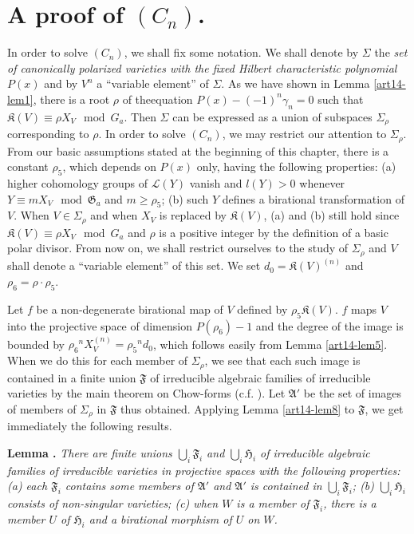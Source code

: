 \section{A proof of \texorpdfstring{$(C_{n})$}{Cn}.}\label{art14-sec9}

In order to solve $(C_{n})$, we shall fix some notation. We shall denote by $\Sigma$ the {\em set of canonically polarized varieties with the fixed Hilbert characteristic polynomial} $P(x)$ and by $V^{n}$ a ``variable element'' of $\Sigma$. As we have shown in Lemma \ref{art14-lem1}, there is a root $\rho$ of the\pageoriginale equation $P(x)-(-1)^{n}\gamma_{n}=0$ such that $\mathfrak{K}(V)\equiv \rho X_{V}\mod G_{a}$. Then $\Sigma$ can be expressed as a union of subspaces $\Sigma_{\rho}$ corresponding to $\rho$. In order to solve $(C_{n})$, we may restrict our attention to $\Sigma_{\rho}$. From our basic assumptions stated at the beginning of this chapter, there is a constant $\rho_{5}$, which depends on $P(x)$ only, having the following properties: (a) higher cohomology groups of $\mathscr{L}(Y)$ vanish and $l(Y)>0$ whenever $Y\equiv mX_{V}\mod \mathfrak{G}_{a}$ and $m\geq \rho_{5}$; (b) such $Y$ defines a birational transformation of $V$. When $V\in \Sigma_{\rho}$ and when $X_{V}$ is replaced by $\mathfrak{K}(V)$, (a) and (b) still hold since $\mathfrak{K}(V)\equiv\rho X_{V}\mod G_{a}$ and $\rho$ is a positive integer by the definition of a basic polar divisor. From now on, we shall restrict ourselves to the study of $\Sigma_{\rho}$ and $V$ shall denote a ``variable element'' of this set. We set $d_{0}=\mathfrak{K}(V)^{(n)}$ and $\rho_{6}=\rho\cdot \rho_{5}$.

Let $f$ be a non-degenerate birational map of $V$ defined by $\rho_{5}\mathfrak{K}(V)$. $f$ maps $V$ into the projective space of dimension $P(\rho_{6})-1$ and the degree of the image is bounded by $\rho_{6}{}^{n}X_{V}^{(n)}=\rho_{5}{}^{n}d_{0}$, which follows easily from Lemma \ref{art14-lem5}. When we do this for each member of $\Sigma_{\rho}$, we see that each such image is contained in a finite union $\mathfrak{F}$ of irreducible algebraic families of irreducible varieties by the main theorem on Chow-forms (c.f. \cite{art14-key3}). Let $\mathfrak{A}'$ be the set of images of members of $\Sigma_{\rho}$ in $\mathfrak{F}$ thus obtained. Applying Lemma \ref{art14-lem8} to $\mathfrak{F}$, we get immediately the following results.

\medskip
\noindent
{\bf Lemma .\label{art14-lem14}}
{\em There are finite unions $\bigcup_{i}\mathfrak{F}_{i}$ and $\bigcup_{i}\mathfrak{H}_{i}$ of irreducible algebraic families of irreducible varieties in projective spaces with the following properties: {\rm(a)} each $\mathfrak{F}_{i}$ contains some members of $\mathfrak{A}'$ and $\mathfrak{A}'$ is contained in $\bigcup_{i}\mathfrak{F}_{i}$; {\rm(b)} $\bigcup_{i}\mathfrak{H}_{i}$ consists of non-singular varieties; {\rm(c)} when $W$ is a member of $\mathfrak{F}_{i}$, there is a member $U$ of $\mathfrak{H}_{i}$ and a birational morphism of $U$ on $W$.}
\smallskip

